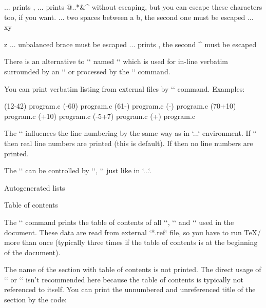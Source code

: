 \begtt
\code{\\text, \%\#} ... prints \text, %
  ... prints @{..}*&^$ $ without escaping, but you can
                        escape these characters too, if you want.
        ... two spaces between a  b, the second one must be escaped
        ... xy{z ... unbalanced brace must be escaped
         ... prints ^^M, the second ^ must be escaped
\endtt

There is an alternative to `\everytt` named `\everyintt` which is used for
in-line verbatim surrounded by an `\activettchar` or processed by the `\code`
command.

You can print verbatim listing from external files by `\verbinput` command. 
Examples:

\begtt
\verbinput (12-42) program.c  %
\verbinput (-60) program.c    % print from begin to the line 60
\verbinput (61-) program.c    % from line 61 to the end
\verbinput (-) program.c      % whole file is printed
\verbinput (70+10) program.c  % from line 70, only 10 lines printed
\verbinput (+10) program.c    % from the last line read, print 10 lines 
\vebrinput (-5+7) program.c   %
\verbinput (+) program.c      % from the last line read to the end
\endtt


The `\ttline` influences the line numbering by the same way as in
`\begtt...\endtt` environment. If `` then real line numbers are
printed (this is default). If  then no line 
numbers are printed.

The `\verbinput` can be controlled by `\everytt`, `\ttindent` just like
in `\begtt...\endtt`.


\sec Autogenerated lists

\secc[toc] Table of contents

The `\maketoc` command prints the table of contents of all `\chap`, `\sec`
and `\secc` used in the document. These data are read from external `*.ref` file, so
you have to run \TeX/ more than once (typically three times if the table of
contents is at the beginning of the document). 

The name of the section with table of contents is not printed. The direct usage
of `\chap` or `\sec` isn't recommended here because the table of contents 
is typically not referenced to itself. You can print the unnumbered and unreferenced
title of the section by the code:

}
